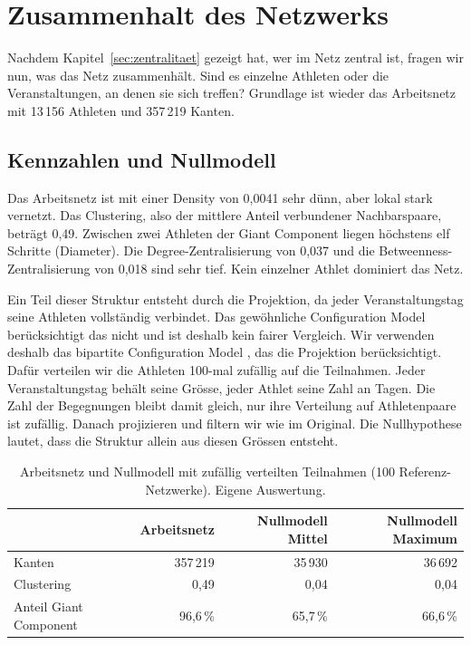 \section{Zusammenhalt des Netzwerks}
\label{sec:zusammenhalt}

Nachdem Kapitel~\ref{sec:zentralitaet} gezeigt hat, wer im Netz zentral
ist, fragen wir nun, was das Netz zusammenhält. Sind es einzelne Athleten
oder die Veranstaltungen, an denen sie sich treffen? Grundlage ist wieder
das Arbeitsnetz mit 13\,156 Athleten und 357\,219 Kanten.

\subsection{Kennzahlen und Nullmodell}
Das Arbeitsnetz ist mit einer Density von 0,0041 sehr dünn, aber lokal
stark vernetzt. Das Clustering, also der mittlere Anteil verbundener
Nachbarspaare, beträgt 0,49. Zwischen zwei Athleten der Giant Component
liegen höchstens elf Schritte (Diameter). Die Degree-Zentralisierung von
0,037 und die Betweenness-Zentralisierung von 0,018 sind sehr tief. Kein
einzelner Athlet dominiert das Netz.

Ein Teil dieser Struktur entsteht durch die Projektion, da jeder
Veranstaltungstag seine Athleten vollständig verbindet. Das gewöhnliche
Configuration Model berücksichtigt das nicht und ist deshalb kein fairer
Vergleich. Wir verwenden deshalb das bipartite Configuration Model
\parencite{newmanStrogatzWatts2001}, das die Projektion berücksichtigt. Dafür verteilen wir die Athleten 100-mal
zufällig auf die Teilnahmen. Jeder Veranstaltungstag behält seine Grösse,
jeder Athlet seine Zahl an Tagen. Die Zahl der Begegnungen bleibt damit
gleich, nur ihre Verteilung auf Athletenpaare ist zufällig. Danach
projizieren und filtern wir wie im Original. Die Nullhypothese
lautet, dass die Struktur allein aus diesen Grössen entsteht.

\begin{table}[H]
  \centering
  \caption{Arbeitsnetz und Nullmodell mit zufällig verteilten Teilnahmen
  (100 Referenz-Netzwerke). Eigene Auswertung.}
  \label{tab:nullmodell}
  \begin{tabular}{@{}lrrr@{}}
    \toprule
    & Arbeitsnetz & Nullmodell Mittel & Nullmodell Maximum \\
    \midrule
    Kanten & 357\,219 & 35\,930 & 36\,692 \\
    Clustering & 0,49 & 0,04 & 0,04 \\
    Anteil Giant Component & 96,6\,\% & 65,7\,\% & 66,6\,\% \\
    \bottomrule
  \end{tabular}
\end{table}


